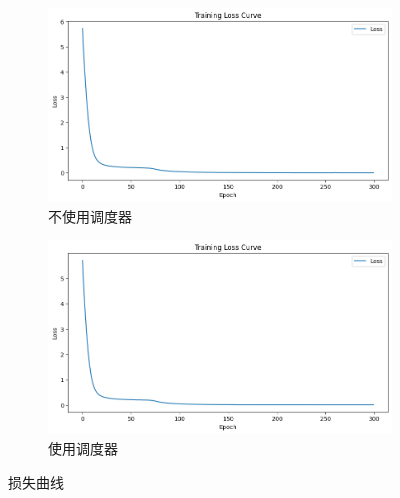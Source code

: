 \begin{figure}[H]
    \centering
    \begin{subfigure}[c]{0.45\textwidth}
        \centering
        \includegraphics[width=\textwidth]{../output/transformer/no scheduler/loss history.png}
        \caption{不使用调度器}
    \end{subfigure}
    \hfill
    \begin{subfigure}[c]{0.45\textwidth}
        \centering
        \includegraphics[width=\textwidth]{../output/transformer/with scheduler/loss history.png}
        \caption{使用调度器}
    \end{subfigure}
    \caption{损失曲线}
\end{figure}

